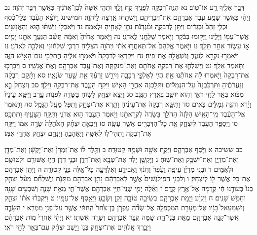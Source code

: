 \documentclass[twoside, openany, parskip=half, 11pt]{book}
\begin{document}
דַּבֵּ֥ר אֵלֶ֖יךָ רַ֥ע אוֹ־טֽוֹב׃ נא הִנֵּֽה־רִבְקָ֥ה לְפָנֶ֖יךָ קַ֣ח וָלֵ֑ךְ וּתְהִ֤י אִשָּׁה֙ לְבֶן־אֲדֹנֶ֔יךָ כַּאֲשֶׁ֖ר דִּבֶּ֥ר יְהֹוָֽה׃ נב וַיְהִ֕י כַּאֲשֶׁ֥ר שָׁמַ֛ע עֶ֥בֶד אַבְרָהָ֖ם אֶת־דִּבְרֵיהֶ֑ם וַיִּשְׁתַּ֥חוּ אַ֖רְצָה לַֽיהֹוָֽה׃ חמישינג וַיּוֹצֵ֨א הָעֶ֜בֶד כְּלֵי־כֶ֨סֶף וּכְלֵ֤י זָהָב֙ וּבְגָדִ֔ים וַיִּתֵּ֖ן לְרִבְקָ֑ה וּמִ֨גְדָּנֹ֔ת נָתַ֥ן לְאָחִ֖יהָ וּלְאִמָּֽהּ׃ נד וַיֹּאכְל֣וּ וַיִּשְׁתּ֗וּ ה֛וּא וְהָאֲנָשִׁ֥ים אֲשֶׁר־עִמּ֖וֹ וַיָּלִ֑ינוּ וַיָּק֣וּמוּ בַבֹּ֔קֶר וַיֹּ֖אמֶר שַׁלְּחֻ֥נִי לַֽאדֹנִֽי׃ נה וַיֹּ֤אמֶר אָחִ֙יהָ֙ וְאִמָּ֔הּ תֵּשֵׁ֨ב הַנַּעֲרָ֥ אִתָּ֛נוּ יָמִ֖ים א֣וֹ עָשׂ֑וֹר אַחַ֖ר תֵּלֵֽךְ׃ נו וַיֹּ֤אמֶר אֲלֵהֶם֙ אַל־תְּאַחֲר֣וּ אֹתִ֔י וַֽיהֹוָ֖ה הִצְלִ֣יחַ דַּרְכִּ֑י שַׁלְּח֕וּנִי וְאֵלְכָ֖ה לַֽאדֹנִֽי׃ נז וַיֹּאמְר֖וּ נִקְרָ֣א לַֽנַּעֲרָ֑ וְנִשְׁאֲלָ֖ה אֶת־פִּֽיהָ׃ נח וַיִּקְרְא֤וּ לְרִבְקָה֙ וַיֹּאמְר֣וּ אֵלֶ֔יהָ הֲתֵלְכִ֖י עִם־הָאִ֣ישׁ הַזֶּ֑ה וַתֹּ֖אמֶר אֵלֵֽךְ׃ נט וַֽיְשַׁלְּח֛וּ אֶת־רִבְקָ֥ה אֲחֹתָ֖ם וְאֶת־מֵנִקְתָּ֑הּ וְאֶת־עֶ֥בֶד אַבְרָהָ֖ם וְאֶת־אֲנָשָֽׁיו׃ ס וַיְבָרְכ֤וּ אֶת־רִבְקָה֙ וַיֹּ֣אמְרוּ לָ֔הּ אֲחֹתֵ֕נוּ אַ֥תְּ הֲיִ֖י לְאַלְפֵ֣י רְבָבָ֑ה וְיִירַ֣שׁ זַרְעֵ֔ךְ אֵ֖ת שַׁ֥עַר שֹׂנְאָֽיו׃ סא וַתָּ֨קׇם רִבְקָ֜ה וְנַעֲרֹתֶ֗יהָ וַתִּרְכַּ֙בְנָה֙ עַל־הַגְּמַלִּ֔ים וַתֵּלַ֖כְנָה אַחֲרֵ֣י הָאִ֑ישׁ וַיִּקַּ֥ח הָעֶ֛בֶד אֶת־רִבְקָ֖ה וַיֵּלַֽךְ׃ סב וְיִצְחָק֙ בָּ֣א מִבּ֔וֹא בְּאֵ֥ר לַחַ֖י רֹאִ֑י וְה֥וּא יוֹשֵׁ֖ב בְּאֶ֥רֶץ הַנֶּֽגֶב׃ סג וַיֵּצֵ֥א יִצְחָ֛ק לָשׂ֥וּחַ בַּשָּׂדֶ֖ה לִפְנ֣וֹת עָ֑רֶב וַיִּשָּׂ֤א עֵינָיו֙ וַיַּ֔רְא וְהִנֵּ֥ה גְמַלִּ֖ים בָּאִֽים׃ סד וַתִּשָּׂ֤א רִבְקָה֙ אֶת־עֵינֶ֔יהָ וַתֵּ֖רֶא אֶת־יִצְחָ֑ק וַתִּפֹּ֖ל מֵעַ֥ל הַגָּמָֽל׃ סה וַתֹּ֣אמֶר אֶל־הָעֶ֗בֶד מִֽי־הָאִ֤ישׁ הַלָּזֶה֙ הַהֹלֵ֤ךְ בַּשָּׂדֶה֙ לִקְרָאתֵ֔נוּ וַיֹּ֥אמֶר הָעֶ֖בֶד ה֣וּא אֲדֹנִ֑י וַתִּקַּ֥ח הַצָּעִ֖יף וַתִּתְכָּֽס׃ סו וַיְסַפֵּ֥ר הָעֶ֖בֶד לְיִצְחָ֑ק אֵ֥ת כׇּל־הַדְּבָרִ֖ים אֲשֶׁ֥ר עָשָֽׂה׃ סז וַיְבִאֶ֣הָ יִצְחָ֗ק הָאֹ֙הֱלָה֙ שָׂרָ֣ה אִמּ֔וֹ וַיִּקַּ֧ח אֶת־רִבְקָ֛ה וַתְּהִי־ל֥וֹ לְאִשָּׁ֖ה וַיֶּאֱהָבֶ֑הָ וַיִּנָּחֵ֥ם יִצְחָ֖ק אַחֲרֵ֥י אִמּֽוֹ׃

כב ששיכה א וַיֹּ֧סֶף אַבְרָהָ֛ם וַיִּקַּ֥ח אִשָּׁ֖ה וּשְׁמָ֥הּ קְטוּרָֽה׃ ב וַתֵּ֣לֶד ל֗וֹ אֶת־זִמְרָן֙ וְאֶת־יׇקְשָׁ֔ן וְאֶת־מְדָ֖ן וְאֶת־מִדְיָ֑ן וְאֶת־יִשְׁבָּ֖ק וְאֶת־שֽׁוּחַ׃ ג וְיׇקְשָׁ֣ן יָלַ֔ד אֶת־שְׁבָ֖א וְאֶת־דְּדָ֑ן וּבְנֵ֣י דְדָ֔ן הָי֛וּ אַשּׁוּרִ֥ם וּלְטוּשִׁ֖ם וּלְאֻמִּֽים׃ ד וּבְנֵ֣י מִדְיָ֗ן עֵיפָ֤ה וָעֵ֙פֶר֙ וַחֲנֹ֔ךְ וַאֲבִידָ֖ע וְאֶלְדָּעָ֑ה כׇּל־אֵ֖לֶּה בְּנֵ֥י קְטוּרָֽה׃ ה וַיִּתֵּ֧ן אַבְרָהָ֛ם אֶת־כׇּל־אֲשֶׁר־ל֖וֹ לְיִצְחָֽק׃ ו וְלִבְנֵ֤י הַפִּֽילַגְשִׁים֙ אֲשֶׁ֣ר לְאַבְרָהָ֔ם נָתַ֥ן אַבְרָהָ֖ם מַתָּנֹ֑ת וַֽיְשַׁלְּחֵ֞ם מֵעַ֨ל יִצְחָ֤ק בְּנוֹ֙ בְּעוֹדֶ֣נּוּ חַ֔י קֵ֖דְמָה אֶל־אֶ֥רֶץ קֶֽדֶם׃ ז וְאֵ֗לֶּה יְמֵ֛י שְׁנֵֽי־חַיֵּ֥י אַבְרָהָ֖ם אֲשֶׁר־חָ֑י מְאַ֥ת שָׁנָ֛ה וְשִׁבְעִ֥ים שָׁנָ֖ה וְחָמֵ֥שׁ שָׁנִֽים׃ ח וַיִּגְוַ֨ע וַיָּ֧מׇת אַבְרָהָ֛ם בְּשֵׂיבָ֥ה טוֹבָ֖ה זָקֵ֣ן וְשָׂבֵ֑עַ וַיֵּאָ֖סֶף אֶל־עַמָּֽיו׃ ט וַיִּקְבְּר֨וּ אֹת֜וֹ יִצְחָ֤ק וְיִשְׁמָעֵאל֙ בָּנָ֔יו אֶל־מְעָרַ֖ת הַמַּכְפֵּלָ֑ה אֶל־שְׂדֵ֞ה עֶפְרֹ֤ן בֶּן־צֹ֙חַר֙ הַֽחִתִּ֔י אֲשֶׁ֖ר עַל־פְּנֵ֥י מַמְרֵֽא׃ י הַשָּׂדֶ֛ה אֲשֶׁר־קָנָ֥ה אַבְרָהָ֖ם מֵאֵ֣ת בְּנֵי־חֵ֑ת שָׁ֛מָּה קֻבַּ֥ר אַבְרָהָ֖ם וְשָׂרָ֥ה אִשְׁתּֽוֹ׃ יא וַיְהִ֗י אַחֲרֵי֙ מ֣וֹת אַבְרָהָ֔ם וַיְבָ֥רֶךְ אֱלֹהִ֖ים אֶת־יִצְחָ֣ק בְּנ֑וֹ וַיֵּ֣שֶׁב יִצְחָ֔ק עִם־בְּאֵ֥ר לַחַ֖י רֹאִֽי׃
\end{document}
